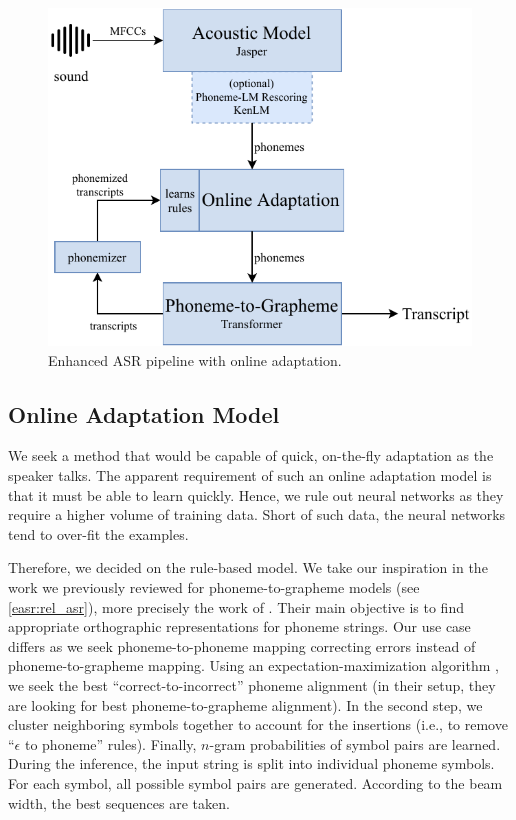 \begin{figure}[t]
    \centering
    \includegraphics[width=.9\textwidth]{img/online_easr}
    \caption{Enhanced ASR pipeline with online adaptation.}
    \label{fig:online_easr}
\end{figure} 


\subsection{Online Adaptation Model}
We seek a method that would be capable of quick, on-the-fly adaptation as the speaker talks. The apparent requirement of such an online adaptation model is that it must be able to learn quickly. Hence, we rule out neural networks as they require a higher volume of training data. Short of such data, the neural networks tend to over-fit the examples. 

Therefore, we decided on the rule-based model. We take our inspiration in the work we previously reviewed for phoneme-to-grapheme models (see \cref{easr:rel_asr}), more precisely the work of . Their main objective is to find appropriate orthographic representations for phoneme strings. Our use case differs as we seek phoneme-to-phoneme mapping correcting errors instead of phoneme-to-grapheme mapping. Using an expectation-maximization algorithm , we seek the best ``correct-to-incorrect'' phoneme alignment (in their setup, they are looking for best phoneme-to-grapheme alignment). In the second step, we cluster neighboring symbols together to account for the insertions (i.e., to remove ``$\epsilon$ to phoneme'' rules). Finally, $n$-gram probabilities of symbol pairs are learned. During the inference, the input string is split into individual phoneme symbols. For each symbol, all possible symbol pairs are generated. According to the beam width, the best sequences are taken. 

